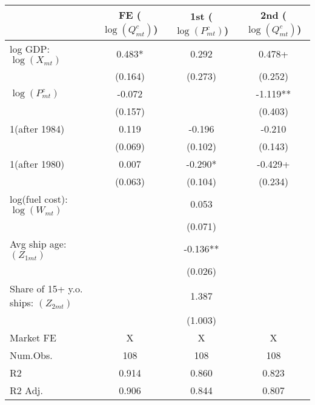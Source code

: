 
\begin{tabular}[t]{lccc}
\toprule
  & FE
($\log(Q_{mt}^c)$) & 1st
($\log(P_{mt}^c)$) & 2nd
($\log(Q_{mt}^c)$)\\
\midrule
log GDP: $\log(X_{mt})$ & 0.483* & 0.292 & 0.478+\\
 & (0.164) & (0.273) & (0.252)\\
$\log(P_{mt}^c)$ & -0.072 &  & -1.119**\\
 & (0.157) &  & (0.403)\\
1(after 1984) & 0.119 & -0.196 & -0.210\\
 & (0.069) & (0.102) & (0.143)\\
1(after 1980) & 0.007 & -0.290* & -0.429+\\
 & (0.063) & (0.104) & (0.234)\\
log(fuel cost): $\log(W_{mt})$ &  & 0.053 & \\
 &  & (0.071) & \\
Avg ship age: $(Z_{1mt})$ &  & -0.136** & \\
 &  & (0.026) & \\
Share of 15+ y.o. ships: $(Z_{2mt})$ &  & 1.387 & \\
 &  & (1.003) & \\
\midrule
Market FE & X & X & X\\
Num.Obs. & 108 & 108 & 108\\
R2 & 0.914 & 0.860 & 0.823\\
R2 Adj. & 0.906 & 0.844 & 0.807\\
\bottomrule
\end{tabular}

